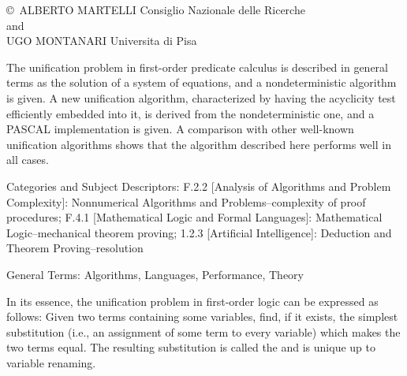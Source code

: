 \label{mmalg}\secdown


\noindent\copyright \
ALBERTO MARTELLI
Consiglio Nazionale delle Ricerche
\\and\\
UGO MONTANARI
Universita di Pisa
\bigskip


The unification problem in first-order predicate calculus is described in
general terms as the solution of a system of equations, and a nondeterministic
algorithm is given. A new unification algorithm, characterized by having the
acyclicity test efficiently embedded into it, is derived from the
nondeterministic one, and a PASCAL implementation is given. A comparison with
other well-known unification algorithms shows that the algorithm described here
performs well in all cases.

Categories and Subject Descriptors: F.2.2 [Analysis of Algorithms and Problem
Complexity]: Nonnumerical Algorithms and Problems--complexity of proof
procedures; F.4.1 [Mathematical Logic and Formal Languages]: Mathematical
Logic--mechanical theorem proving; 1.2.3 [Artificial Intelligence]: Deduction
and Theorem Proving--resolution

General Terms: Algorithms, Languages, Performance, Theory 


In its essence, the unification problem in first-order logic can be expressed as
follows: Given two terms containing some variables, find, if it exists, the
simplest substitution (i.e., an assignment of some term to every variable) which
makes the two terms equal. The resulting substitution is called the \term{most
general unifier} and is unique up to variable renaming.


